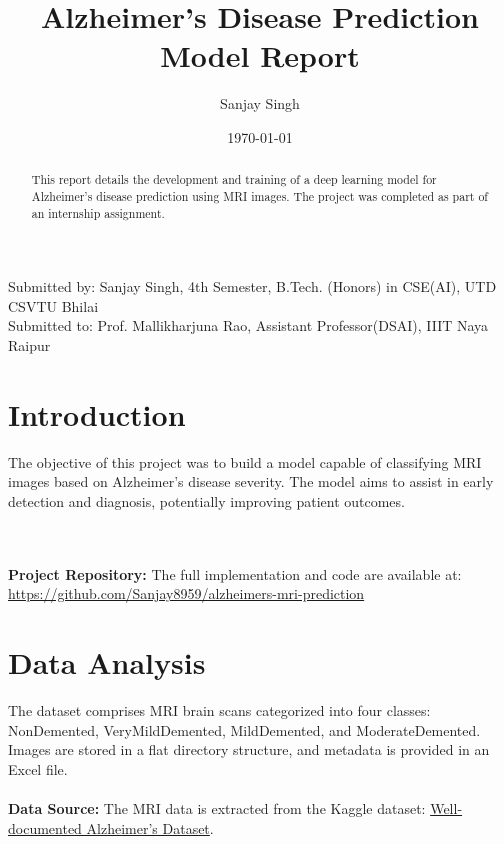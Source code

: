 \documentclass{article}
\title{Alzheimer's Disease Prediction Model Report}
\author{Sanjay Singh}
\date{\today}
\begin{document}
\maketitle

\begin{center}
Submitted by: Sanjay Singh, 4th Semester, B.Tech. (Honors) in CSE(AI), UTD CSVTU Bhilai \\
Submitted to: Prof. Mallikharjuna Rao, Assistant Professor(DSAI), IIIT Naya Raipur
\end{center}

\begin{abstract}
This report details the development and training of a deep learning model for Alzheimer's disease prediction using MRI images. The project was completed as part of an internship assignment.
\end{abstract}

\section{Introduction}
The objective of this project was to build a model capable of classifying MRI images based on Alzheimer's disease severity. The model aims to assist in early detection and diagnosis, potentially improving patient outcomes.

\\
\\
\textbf{Project Repository:} The full implementation and code are available at: 
\href{https://github.com/Sanjay8959/alzheimers-mri-prediction}{https://github.com/Sanjay8959/alzheimers-mri-prediction}

\section{Data Analysis}
The dataset comprises MRI brain scans categorized into four classes: NonDemented, VeryMildDemented, MildDemented, and ModerateDemented. Images are stored in a flat directory structure, and metadata is provided in an Excel file.\\
\\
\textbf{Data Source:} The MRI data is extracted from the Kaggle dataset: \href{https://www.kaggle.com/datasets/yiweilu2033/well-documented-alzheimers-dataset}{Well-documented Alzheimer's Dataset}.
\end{document}
